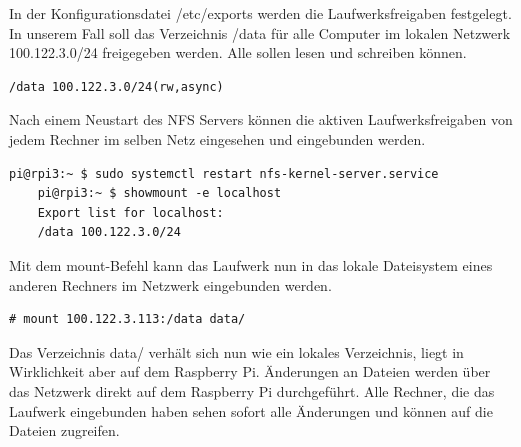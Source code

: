 \documentclass[
a4paper,     %
 headsepline, %
11pt         %
]{scrartcl}  %
\begin{document}
In der Konfigurationsdatei /etc/exports werden die Laufwerksfreigaben festgelegt. 
In unserem Fall soll das Verzeichnis /data für alle Computer im lokalen Netzwerk 100.122.3.0/24 freigegeben werden. 
Alle sollen lesen und schreiben können.
\begin{lstlisting}[frame=single]
	/data 100.122.3.0/24(rw,async)
\end{lstlisting}

Nach einem Neustart des NFS Servers können die aktiven Laufwerksfreigaben von jedem Rechner im selben Netz eingesehen und eingebunden werden.
\begin{lstlisting}[frame=single]
	pi@rpi3:~ $ sudo systemctl restart nfs-kernel-server.service
	pi@rpi3:~ $ showmount -e localhost
	Export list for localhost:
	/data 100.122.3.0/24
\end{lstlisting}

Mit dem mount-Befehl kann das Laufwerk nun in das lokale Dateisystem eines anderen Rechners im Netzwerk eingebunden werden.
\begin{lstlisting}[frame=single]
	# mount 100.122.3.113:/data data/
\end{lstlisting}
Das Verzeichnis data/ verhält sich nun wie ein lokales Verzeichnis, liegt in Wirklichkeit aber auf dem Raspberry Pi. 
Änderungen an Dateien werden über das Netzwerk direkt auf dem Raspberry Pi durchgeführt. 
Alle Rechner, die das Laufwerk eingebunden haben sehen sofort alle Änderungen und können auf die Dateien zugreifen.



% 

% 
\end{document}
